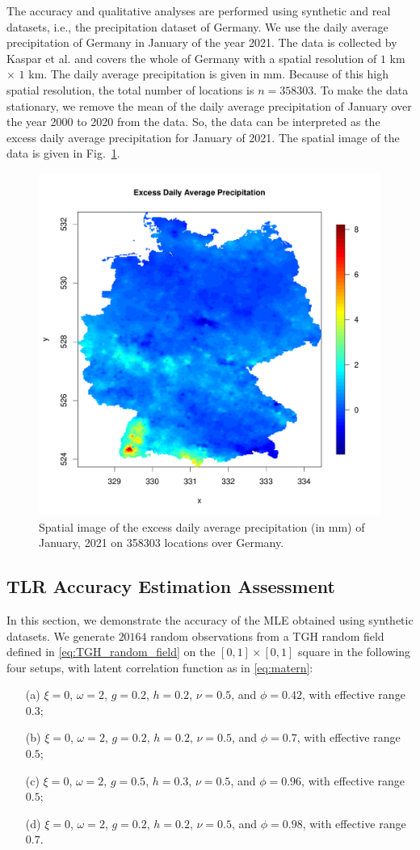 \documentclass[conference]{IEEEtran}
\begin{document}
The accuracy and qualitative analyses are performed using synthetic and real datasets, i.e., the precipitation dataset of Germany. We use the daily average precipitation of Germany in January of the year 2021. The data is collected by Kaspar et al. \cite{kaspar2013monitoring} and covers the whole of Germany with a spatial resolution of $1$ km $\times$ $1$ km. The daily average precipitation is given in mm. Because of this high spatial resolution, the total number of locations is $n = 358303$. To make the data stationary, we remove the mean of the daily average precipitation of January over the year 2000 to 2020 from the data. So, the data can be interpreted as the excess daily average precipitation for January of 2021. The spatial image of the data is given in Fig.~\ref{fig:data_image}.
\begin{figure}[h]
\centering
\includegraphics[width=0.7\linewidth]{./figures/data_spatial_image.pdf}
  \caption{Spatial image of the excess daily average precipitation (in mm) of January, 2021 on 358303 locations over Germany.
}
  \label{fig:data_image}
\end{figure}

\subsection{TLR Accuracy Estimation Assessment}
In this section, we demonstrate the accuracy of the MLE obtained using synthetic datasets. We generate $20164$ random observations from a TGH random field defined in \eqref{eq:TGH_random_field} on the  $[0,1]\times[0,1]$ square in the following four setups, with latent correlation function as in \eqref{eq:matern}:
\begin{enumerate}
\item[(a)] $\xi = 0$, $\omega = 2$, $g = 0.2$, $h = 0.2$, $\nu = 0.5$, and $\phi = 0.42$, with effective range $0.3$;
\item[(b)] $\xi = 0$, $\omega = 2$, $g = 0.2$, $h = 0.2$, $\nu = 0.5$, and $\phi = 0.7$, with effective range $0.5$;
\item[(c)] $\xi = 0$, $\omega = 2$, $g = 0.5$, $h = 0.3$, $\nu = 0.5$, and $\phi = 0.96$, with effective range $0.5$;
\item[(d)] $\xi = 0$, $\omega = 2$, $g = 0.2$, $h = 0.2$, $\nu = 0.5$, and $\phi = 0.98$, with effective range $0.7$.
\end{enumerate}
\end{document}
